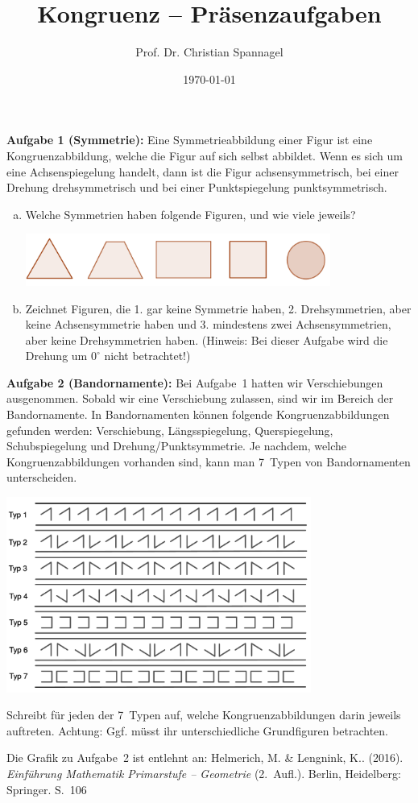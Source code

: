 \documentclass{../cssheet}
\title{Kongruenz -- Präsenzaufgaben}
\author{Prof. Dr. Christian Spannagel}
\date{\today}
\begin{document}
\printtitle

\vspace*{5mm}

\textbf{Aufgabe 1 (Symmetrie):}  Eine Symmetrieabbildung einer Figur ist eine Kongruenzabbildung, welche die Figur auf sich selbst abbildet. Wenn es sich um eine Achsenspiegelung handelt, dann ist die Figur achsensymmetrisch, bei einer Drehung drehsymmetrisch und bei einer Punktspiegelung punktsymmetrisch.
\begin{enumerate}[a)]
\item Welche Symmetrien haben folgende Figuren, und wie viele jeweils?
\begin{center}
\includegraphics[width=10cm]{symmetrische-figuren.png}
\end{center} 
\item Zeichnet Figuren, die 1. gar keine Symmetrie haben, 2. Drehsymmetrien, aber keine Achsensymmetrie haben und 3. mindestens zwei Achsensymmetrien, aber keine Drehsymmetrien haben. (Hinweis: Bei dieser Aufgabe wird die Drehung um $0^\circ$ nicht betrachtet!)
\end{enumerate}


\textbf{Aufgabe 2 (Bandornamente):}  Bei Aufgabe~1 hatten wir Verschiebungen ausgenommen. Sobald wir eine Verschiebung zulassen, sind wir im Bereich der Bandornamente. In Bandornamenten können folgende Kongruenzabbildungen gefunden werden: Verschiebung, Längsspiegelung, Querspiegelung, Schubspiegelung und Drehung/Punktsymmetrie. Je nachdem, welche Kongruenzabbildungen vorhanden sind, kann man 7~Typen von Bandornamenten unterscheiden.

\begin{center}
\includegraphics[width=10cm]{bandornamente.png}
\end{center} 

Schreibt für jeden der 7~Typen auf, welche Kongruenzabbildungen darin jeweils auftreten. Achtung: Ggf. müsst ihr unterschiedliche Grundfiguren betrachten.

Die Grafik zu Aufgabe~2 ist entlehnt an: Helmerich, M. \& Lengnink, K.. (2016). \emph{Einführung Mathematik Primarstufe -- Geometrie} (2.~Aufl.). Berlin, Heidelberg: Springer. S.~106

\newpage
\printlicense

\printsocials
\end{document}
